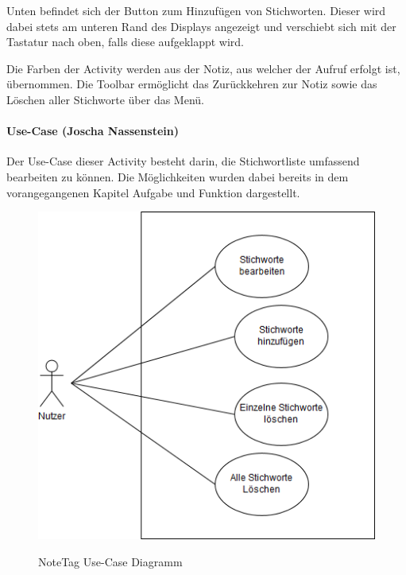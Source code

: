 Unten befindet sich der Button zum Hinzufügen von Stichworten. Dieser wird dabei stets am unteren Rand des Displays angezeigt und verschiebt sich mit der Tastatur nach oben, falls diese aufgeklappt wird.

Die Farben der Activity werden aus der Notiz, aus welcher der Aufruf erfolgt ist, übernommen. Die Toolbar ermöglicht das Zurückkehren zur Notiz sowie das Löschen aller Stichworte über das Menü.

\paragraph{Use-Case (Joscha Nassenstein)}
Der Use-Case dieser Activity besteht darin, die Stichwortliste umfassend bearbeiten zu können. Die Möglichkeiten wurden dabei bereits in dem vorangegangenen Kapitel Aufgabe und Funktion dargestellt. 

\begin{figure}[H]
\centering
\begin{minipage}[t]{1\textwidth} %
\caption{NoteTag Use-Case Diagramm} %
\includegraphics[width=1 \textwidth]{img/noteTagsUseCase}\\ %
\end{minipage}
\end{figure}

